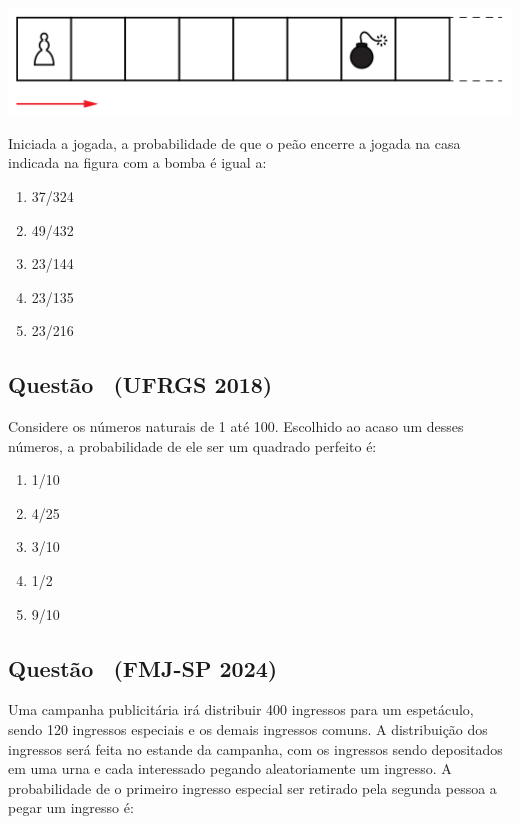 \documentclass[12pt]{article}
\newcounter{questao}
\newcommand{\novaquestao}[1]{%
  \stepcounter{questao}%
  \subsection*{Questão \thequestao\ (#1)}%
}
\begin{document}
\begin{multicols}{2}
            \begin{center}
                \includegraphics[scale=0.5]{imagens/unesp-2017.png}
            \end{center} Iniciada a jogada, a probabilidade de que o peão encerre a jogada 
            na casa indicada na figura com a bomba é igual a:

            \begin{enumerate}[label=(\alph*), noitemsep]
                \item {37}/{324}
                \item {49}/{432}
                \item {23}/{144}
                \item {23}/{135}
                \item {23}/{216}
            \end{enumerate}
        
        \novaquestao{UFRGS 2018}

            Considere os números naturais de 1 até 100. Escolhido ao acaso um desses números, 
            a probabilidade de ele ser um quadrado perfeito é:

            \begin{enumerate}[label=(\alph*), noitemsep]
                \item {1}/{10}
                \item {4}/{25}
                \item {3}/{10}
                \item {1}/{2}
                \item {9}/{10}
            \end{enumerate}
        
        \novaquestao{FMJ-SP 2024}
            
            Uma campanha publicitária irá distribuir 400 ingressos para um espetáculo, sendo 
            120 ingressos especiais e os demais ingressos comuns. A distribuição dos ingressos
            será feita no estande da campanha, com os ingressos sendo depositados em uma urna 
            e cada interessado pegando aleatoriamente um ingresso. A probabilidade de o 
            primeiro ingresso especial ser retirado pela segunda pessoa a pegar um ingresso 
            é:


\end{multicols}
\end{document}
